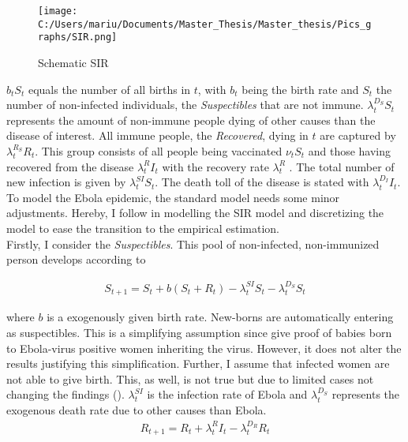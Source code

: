 \documentclass{article}
\begin{document}
\begin{figure}[!ht]
\begin{center}\caption{ Schematic SIR \label{Schematic SIR}}
\texttt{[image: C:/Users/mariu/Documents/Master\_Thesis/Master\_thesis/Pics\_graphs/SIR.png]}\\
\end{center}
\end{figure}

$b_t S_t$ equals the number of all births in $t$, with $b_t$ being the birth rate and $S_t$ the number of non-infected individuals, the \textit{Suspectibles} that are not immune. $\lambda_t^{D_S} S_t$ represents the amount of non-immune people dying of other causes than the disease of interest. All immune people, the \textit{Recovered}, dying in $t$ are captured by $\lambda_t^{R_S} R_t$. This group consists of all people being vaccinated $\nu_t S_t$ and those having recovered from the disease $\lambda_t^{R} I_t$ with the recovery rate $\lambda_t^{R}$ . The total number of new infection is given by $\lambda_t^{SI} S_t$. The death toll of the disease is stated with $\lambda_t^{D_I} I_t$. \\
To model the Ebola epidemic, the standard model needs some minor adjustments. Hereby, I follow \cite{hansen2017preventing} in modelling the SIR model and discretizing the model to ease the transition to the empirical estimation. \\
Firstly, I consider the \textit{Suspectibles}. This pool of non-infected, non-immunized person develops according to

\begin{align*}
S_{t+1} = S_t + b (S_t + R_t) - \lambda_t^{SI} S_t - \lambda_t^{D_S} S_t
\end{align*}

where $b$ is a exogenously given birth rate. New-borns are automatically entering as suspectibles. This is a simplifying assumption since \cite{dornemann2017first} give proof of babies born to Ebola-virus positive women inheriting the virus. However, it does not alter the results justifying this simplification. Further, I assume that infected women are not able to give birth. This, as well, is not true but due to limited cases not changing the findings (\cite{baggi2014management}). $\lambda_t^{SI}$ is the infection rate of Ebola and $\lambda_t^{D_S}$ represents the exogenous death rate due to other causes than Ebola. \\

\begin{align*}
R_{t+1} = R_t + \lambda_t^{R} I_t - \lambda_t^{D_R} R_t
\end{align*}
\end{document}
